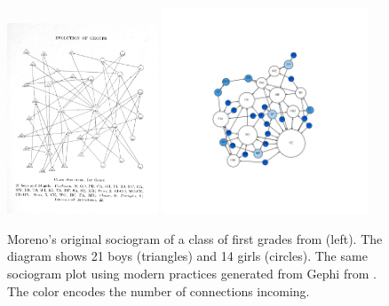 \begin{figure}
    \centering %
    \includegraphics[width=0.4\textwidth]{static/figures/RelatedWork/Moreno-1}
    \includegraphics[width=0.55\textwidth]{static/figures/RelatedWork/Moreno-1_GrandJean}
    \caption{Moreno's original sociogram of a class of first grades from \cite{morenoWhoShallSurvive1934} (left). The diagram shows 21 boys (triangles) and 14 girls (circles). The same sociogram plot using modern practices generated from Gephi from \cite{grandjeanSocialNetworkAnalysis2015}. The color encodes the number of connections incoming.}
    \label{fig:moreno-sociogram}
\end{figure}

